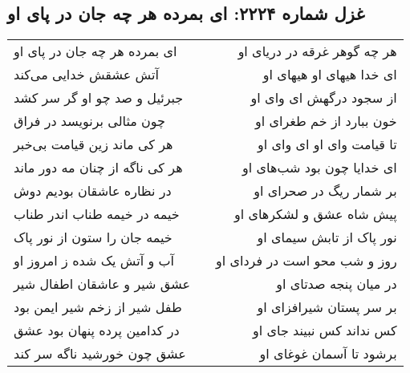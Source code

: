 \begin{center}
\section*{غزل شماره ۲۲۲۴: ای بمرده هر چه جان در پای او}
\label{sec:2224}
\begin{longtable}{l p{0.5cm} r}
ای بمرده هر چه جان در پای او
&&
هر چه گوهر غرقه در دریای او
\\
آتش عشقش خدایی می‌کند
&&
ای خدا هیهای او هیهای او
\\
جبرئیل و صد چو او گر سر کشد
&&
از سجود درگهش ای وای او
\\
چون مثالی برنویسد در فراق
&&
خون ببارد از خم طغرای او
\\
هر کی ماند زین قیامت بی‌خبر
&&
تا قیامت وای او ای وای او
\\
هر کی ناگه از چنان مه دور ماند
&&
ای خدایا چون بود شب‌های او
\\
در نظاره عاشقان بودیم دوش
&&
بر شمار ریگ در صحرای او
\\
خیمه در خیمه طناب اندر طناب
&&
پیش شاه عشق و لشکرهای او
\\
خیمه جان را ستون از نور پاک
&&
نور پاک از تابش سیمای او
\\
آب و آتش یک شده ز امروز او
&&
روز و شب محو است در فردای او
\\
عشق شیر و عاشقان اطفال شیر
&&
در میان پنجه صدتای او
\\
طفل شیر از زخم شیر ایمن بود
&&
بر سر پستان شیرافزای او
\\
در کدامین پرده پنهان بود عشق
&&
کس نداند کس نبیند جای او
\\
عشق چون خورشید ناگه سر کند
&&
برشود تا آسمان غوغای او
\\
\end{longtable}
\end{center}
